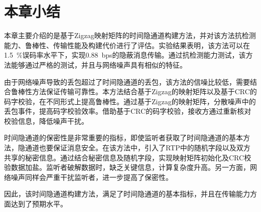 \section{本章小结}
\label{chap:zigzag:summary}

本章主要介绍的是基于Zigzag映射矩阵的时间隐通道构建方法，并对该方法抗检测能力、鲁棒性、传输性能及构建代价进行了评估。实验结果表明，该方法可以在{1.5\ \%}误码率水平下，实现{0.88\ bps}的隐蔽消息传输。通过抗检测能力测试，该方法能够通过严格的测试，并且与网络噪声具有相似的特征。

由于网络噪声导致的丢包超过了时间隐通道的丢包，该方法的信噪比较低，需要结合鲁棒性方法保证传输可靠性。本方法结合基于Zigzag的映射矩阵以及基于CRC的码字校验，在不同形式上提高鲁棒性。通过基于Zigzag的映射矩阵，分散噪声中的丢包事件，提高码字校验效率。借助基于CRC的码字校验，接收方通过重新核对校验信息，降低噪声干扰。

时间隐通道的保密性是非常重要的指标，即使监听者获取了时间隐通道的基本方法，隐通道也要保证消息安全。在该方法中，引入了RTP中的随机字段以及双方共享的秘密信息。通过结合秘密信息及随机字段，实现映射矩阵初始化及CRC校验数据加盐。监听者破解数据时，缺乏关键信息，计算复杂度升高。另一方面，网络噪声同样会严重干扰监听者，进一步提高了保密性。

因此，该时间隐通道构建方法，满足了时间隐通道的基本指标，并且在传输能力方面达到了预期水平。